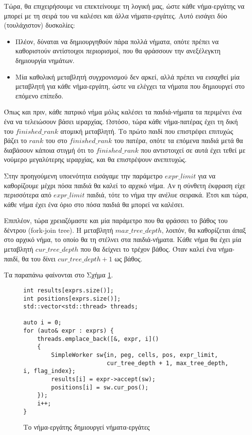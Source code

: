 Τώρα, θα επιχειρήσουμε να επεκτείνουμε τη λογική μας, ώστε κάθε νήμα-εργάτης να μπορεί με τη σειρά του να καλέσει και άλλα νήματα-εργάτες.
Αυτό εισάγει δύο (τουλάχιστον) δυσκολίες:

\begin{itemize}
	\item Πλέον, δύναται να δημιουργηθούν πάρα πολλά νήματα, οπότε πρέπει να καθοριστούν αντίστοιχοι περιορισμοί, που θα φράσσουν την ανεξέλεγκτη δημιουργία νημάτων.
	\item Μία καθολική μεταβλητή συγχρονισμού δεν αρκεί, αλλά πρέπει να εισαχθεί μία μεταβλητή για κάθε νήμα-εργάτη, ώστε να ελέγχει τα νήματα που δημιουργεί στο επόμενο επίπεδο.
\end{itemize}

Όπως και πριν, κάθε πατρικό νήμα μόλις καλέσει τα παιδιά-νήματα τα περιμένει ένα ένα να τελειώσουν βάσει ιεραρχίας.
Ωστόσο, τώρα κάθε νήμα-πατέρας έχει τη δική του $finished\_rank$ ατομική μεταβλητή.
Το πρώτο παιδί που επιστρέφει επιτυχώς βάζει το $rank$ του στο $finished\_rank$ του πατέρα, οπότε τα επόμενα παιδιά μετά θα διαβάσουν κάποια στιγμή ότι το $finished\_rank$ που αντιστοιχεί σε αυτά  έχει τεθεί με νούμερο μεγαλύτερης ιεραρχίας, και θα επιστρέψουν ανεπιτυχώς. 

Στην προηγούμενη υποενότητα εισάγαμε την παράμετρο $expr\_limit$ για να καθορίζουμε μέχρι πόσα παιδιά θα καλεί το αρχικό νήμα.
Αν η σύνθετη έκφραση είχε περισσότερα από $expr\_limit$ παιδιά, τότε το νήμα την ανέλυε σειρακά.
Έτσι και τώρα, κάθε νήμα έχει ένα όριο στο πόσα παιδιά θα μπορεί να καλέσει.

Επιπλέον, τώρα χρειαζόμαστε και μία παράμετρο που θα φράσσει το βάθος του δέντρου (fork-join tree).
Η μεταβλητή $max\_tree\_depth$, λοιπόν, θα καθορίζεται άπαξ στο αρχικό νήμα, το οποίο θα τη στέλνει στα παιδιά-νήματα.
Κάθε νήμα θα έχει μία μεταβλητή $cur\_tree\_depth$ που θα δείχνει το τρέχον βάθος.
Όταν καλεί ένα νήμα-παιδί, θα του δίνει $cur\_tree\_depth + 1$ ως βάθος.

Τα παραπάνω φαίνονται στο Σχήμα \ref{fig:rec_top_down_1}.
\begin{figure}[h]
\setlength\partopsep{-\topsep}%
\begin{verbatim}
int results[exprs.size()];
int positions[exprs.size()];
std::vector<std::thread> threads;

auto i = 0;
for (auto& expr : exprs) {
    threads.emplace_back([&, expr, i]()
    {
        SimpleWorker sw{in, peg, cells, pos, expr_limit, 
                        cur_tree_depth + 1, max_tree_depth, i, flag_index};
        results[i] = expr->accept(sw);
        positions[i] = sw.cur_pos();
    });
    i++;
}
\end{verbatim}
  \caption{Tο νήμα-εργάτης δημιουργεί νήματα-εργάτες}
\label{fig:rec_top_down_1}
\end{figure}

